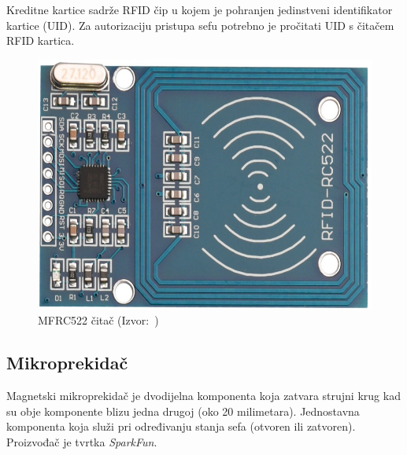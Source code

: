 Kreditne kartice sadrže RFID čip u kojem je pohranjen jedinstveni identifikator kartice (UID).
Za autorizaciju pristupa sefu potrebno je pročitati UID s čitačem RFID kartica.

\begin{figure}[h!]
    \centering
    \includegraphics[scale=0.25]{images/mfrc522}
    \caption{MFRC522 čitač (Izvor:~\cite{mfrc522-eradionica})}
\end{figure}

\subsection{Mikroprekidač}

Magnetski mikroprekidač je dvodijelna komponenta koja zatvara strujni krug kad su obje komponente blizu jedna drugoj
(oko 20 milimetara).
Jednostavna komponenta koja služi pri određivanju stanja sefa (otvoren ili zatvoren).
Proizvođač je tvrtka \textit{SparkFun}.


